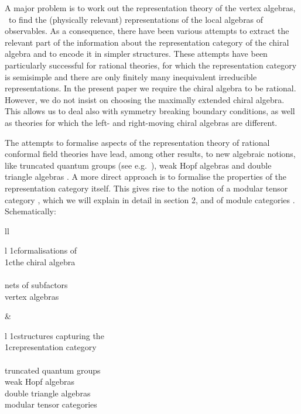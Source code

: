 A major problem is to work out the representation theory of the vertex 
algebras, \resp\ to find the (physically relevant) representations of the 
local algebras of observables. As a 
consequence, there have been various attempts to extract the relevant part
of the information about the representation category of the chiral algebra
and to encode it in simpler structures. These attempts have been particularly 
successful for rational theories, for which the representation category is
semisimple and there are only finitely
many inequivalent irreducible representations. In the present paper we 
require the chiral algebra to be rational. However, we do not insist on
choosing the maximally extended chiral algebra. This allows us to deal also
with symmetry breaking boundary conditions, as well as theories for which
the left- and right-moving chiral algebras are different.

The attempts to formalise aspects of the representation theory of rational
conformal field theories have lead, among other results, to 
new algebraic notions, like truncated quantum groups (see e.g.\ 
\cite{masc3,vecs,szla,jf25,fugv3}), weak Hopf algebras 
\cite{szla3,bons,bosz2,etno} and double triangle algebras \cite{ocne7,ocne9}. 
A more direct approach is to formalise the properties 
of the representation category itself. This gives rise to the notion of a
modular tensor category \cite{TUra}, which we will explain in detail in 
section 2, and of module categories \cite{ostr}. Schematically:

\begin{center}
\begin{tabular}{ll}
%
\begin{tabular}{l}
\multicolumn1c{formalisations of}  \\[-2pt]
\multicolumn1c{the chiral algebra} \\[3pt] \hline \\[-1pt]
nets of subfactors \\[11pt]
vertex algebras \\[-1pt]{}
\end{tabular}
%
\mbox{\hspace{3em}}&
%
\begin{tabular}{l}
\multicolumn1c{structures capturing the}\\[-2pt]
\multicolumn1c{representation category} \\[3pt] \hline\\[-7pt]
truncated quantum groups\\[1pt]
weak Hopf algebras\\[1pt]
double triangle algebras\\[1pt]
modular tensor categories 
\end{tabular}
%
\end{tabular}
\end{center}

